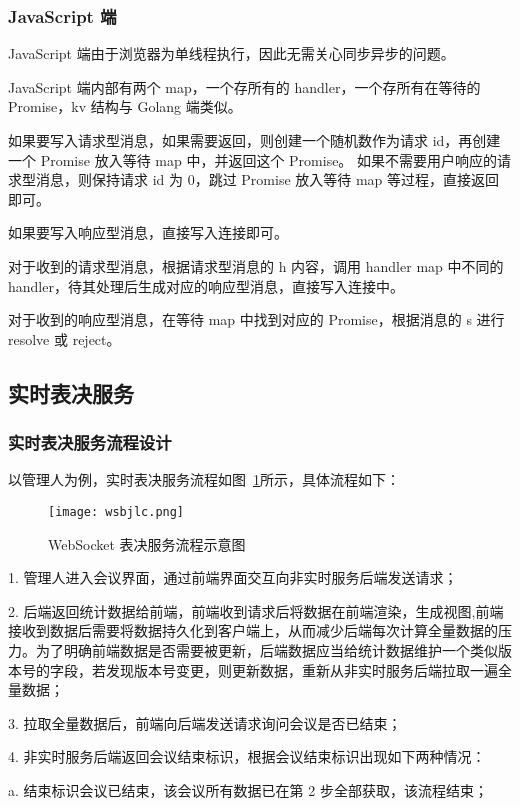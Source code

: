 \subsubsection{JavaScript 端}
JavaScript 端由于浏览器为单线程执行，因此无需关心同步异步的问题。

JavaScript 端内部有两个 map，一个存所有的 handler，一个存所有在等待的 Promise，kv 结构与 Golang 端类似。

如果要写入请求型消息，如果需要返回，则创建一个随机数作为请求 id，再创建一个 Promise 放入等待 map 中，并返回这个 Promise。
如果不需要用户响应的请求型消息，则保持请求 id 为 0，跳过 Promise 放入等待 map 等过程，直接返回即可。

如果要写入响应型消息，直接写入连接即可。

对于收到的请求型消息，根据请求型消息的 h 内容，调用 handler map 中不同的 handler，待其处理后生成对应的响应型消息，直接写入连接中。

对于收到的响应型消息，在等待 map 中找到对应的 Promise，根据消息的 s 进行 resolve 或 reject。

\subsection{实时表决服务}

\subsubsection{实时表决服务流程设计}
以管理人为例，实时表决服务流程如图~\ref{fig:wsbjlc}所示，具体流程如下：

\begin{figure}[!htp]
    \centering
    \texttt{[image: wsbjlc.png]}
    \caption{WebSocket 表决服务流程示意图}
    \label{fig:wsbjlc}
  \end{figure}

  1. 管理人进入会议界面，通过前端界面交互向非实时服务后端发送请求；

 2. 后端返回统计数据给前端，前端收到请求后将数据在前端渲染，生成视图,前端接收到数据后需要将数据持久化到客户端上，从而减少后端每次计算全量数据的压力。为了明确前端数据是否需要被更新，后端数据应当给统计数据维护一个类似版本号的字段，若发现版本号变更，则更新数据，重新从非实时服务后端拉取一遍全量数据；

3. 拉取全量数据后，前端向后端发送请求询问会议是否已结束；

4. 非实时服务后端返回会议结束标识，根据会议结束标识出现如下两种情况：

  \quad{}\quad{}a. 结束标识会议已结束，该会议所有数据已在第 2 步全部获取，该流程结束；
  
